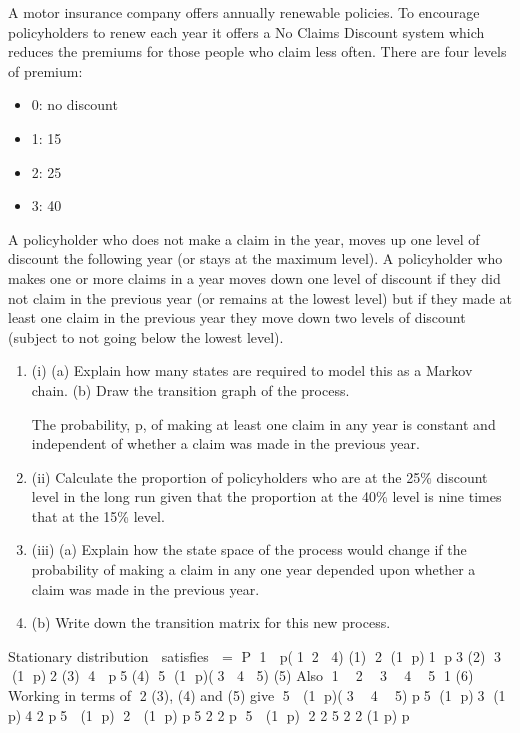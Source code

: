\documentclass[a4paper,12pt]{article}
\begin{document}
A motor insurance company offers annually renewable policies. To encourage
policyholders to renew each year it offers a No Claims Discount system which
reduces the premiums for those people who claim less often. There are four levels of
premium:
\begin{itemize}
\item   0: no discount
\item 1: 15%
\item 2: 25%
\item 3: 40%
\end{itemize}

A policyholder who does not make a claim in the year, moves up one level of
discount the following year (or stays at the maximum level).
A policyholder who makes one or more claims in a year moves down one level of
discount if they did not claim in the previous year (or remains at the lowest level) but
if they made at least one claim in the previous year they move down two levels of
discount (subject to not going below the lowest level).
\begin{enumerate}
\item (i) (a) Explain how many states are required to model this as a Markov chain.
(b) Draw the transition graph of the process. \\
\smallskip


The probability, p, of making at least one claim in any year is constant and
independent of whether a claim was made in the previous year.
\item (ii) Calculate the proportion of policyholders who are at the 25\% discount level in
the long run given that the proportion at the 40\% level is nine times that at the
15\% level. 
\item (iii) (a) Explain how the state space of the process would change if the
probability of making a claim in any one year depended upon whether
a claim was made in the previous year.
\item (b) Write down the transition matrix for this new process. 
\end{enumerate}
\newpage


Stationary distribution  satisfies  = P
1  p(12 4) (1)
2 (1 p)1 p3 (2)
3 (1 p)2 (3)
4  p5 (4)
5 (1 p)(3 4 5) (5)
Also 1  2  3  4  5 1 (6)
Working in terms of 2
(3), (4) and (5) give 5  (1 p)(3  4  5)
p5 (1 p)3 (1 p)4
2
p5  (1 p) 2  (1 p) p5
2 2
p 5  (1 p) 2
2
5 2 2
(1 p)
p

  
\end{document}
